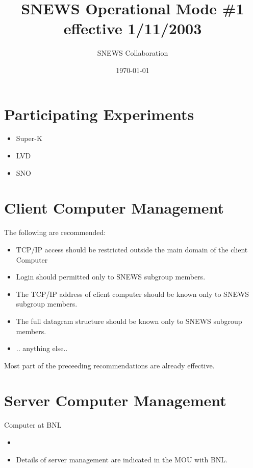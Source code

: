 \documentclass{article}
\begin{document}
\title{SNEWS Operational Mode \#1 effective 1/11/2003}         
\author{SNEWS Collaboration}
\date{\today}
\maketitle

\section{Participating Experiments}

\begin{itemize}
\item Super-K
\item LVD
\item SNO
\end{itemize}

\section{Client Computer Management}

The following are recommended:

\begin{itemize}
\item TCP/IP access should be restricted outside the main domain of the client Computer
\item Login should permitted only to SNEWS subgroup members.
\item The TCP/IP address of client computer should be known only to SNEWS subgroup members.
\item The full datagram structure should be known only to SNEWS subgroup members.
\item .. anything else..
\end{itemize}
Most part of the preceeding recommendations are already effective.

\section{Server Computer Management}

Computer at BNL
\begin{itemize}
\item 
\item Details of server management are indicated in the MOU with BNL.
\end{itemize}
\end{document}
